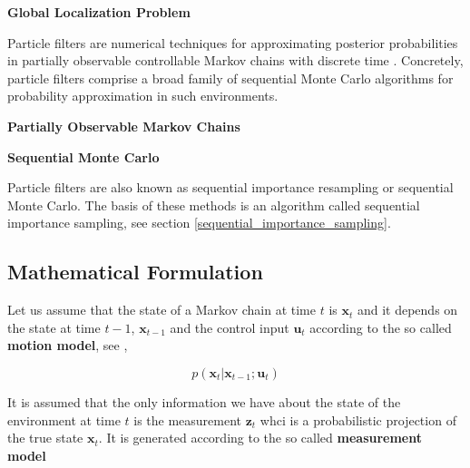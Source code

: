 \begin{framed}
\begin{remark}{\textbf{Global Localization  Problem}}
\end{remark}
\end{framed}
 
Particle filters are numerical techniques for approximating posterior probabilities in partially observable controllable Markov 
chains with discrete time \cite{Thurn2002}. Concretely, particle filters comprise a broad family of sequential Monte Carlo algorithms
for probability approximation in such environments.

\begin{framed}
\begin{remark}{\textbf{Partially Observable Markov Chains}}
\end{remark}
\end{framed}

\begin{framed}
\begin{remark}{\textbf{Sequential Monte Carlo}}

Particle filters are also known as sequential importance resampling or sequential Monte Carlo.
The basis of these methods is an algorithm called  sequential importance sampling, see section \ref{sequential_importance_sampling}. 
\end{remark}
\end{framed}

\subsection{Mathematical Formulation}
\label{pf_mathematical_formulation}

Let us assume that the state of a Markov chain at time $t$ is $\mathbf{x}_t$ and it depends on the
state at time $t-1$, $\mathbf{x}_{t-1}$ and the control input $\mathbf{u}_t$ according to the so called \textbf{motion model}, see \cite{Thurn2002}, 

\begin{equation}
p(\mathbf{x}_t | \mathbf{x}_{t-1}; \mathbf{u}_{t}) 
\label{pf_motion_model}
\end{equation}

It is assumed that the only information we have about the state of the environment at time $t$ is the measurement $\mathbf{z}_t$
whci is a probabilistic projection of the true state $\mathbf{x}_t$. It is generated according to the so called \textbf{measurement model}


